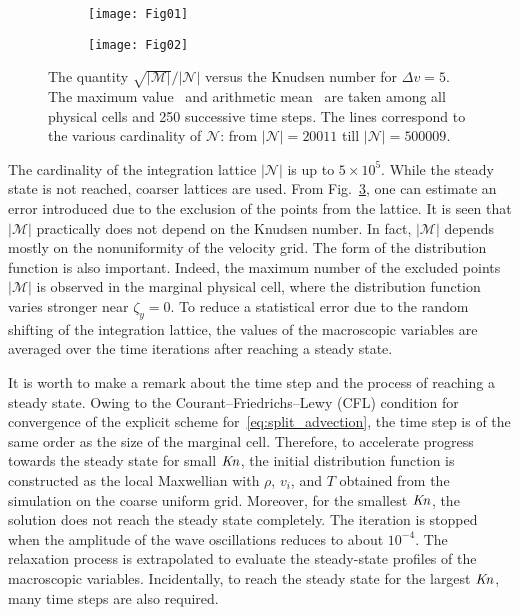 \documentclass[final]{jfm} %
\newcommand{\Kn}{\mbox{\textit{Kn}}}
\newcommand{\Nu}{\mathcal{N}}
\newcommand{\Mu}{\mathcal{M}}
\begin{document}
\begin{figure}
    \centering
    \begin{subfigure}[b]{.5\linewidth}
        \texttt{[image: Fig01]}
        \caption{}
        \label{fig:exclusions-max}
    \end{subfigure}%
    \begin{subfigure}[b]{.5\linewidth}
        \texttt{[image: Fig02]}
        \caption{}
        \label{fig:exclusions-mean}
    \end{subfigure}
    \caption{The quantity \(\sqrt{|\Mu|}/|\Nu|\) versus the Knudsen number for \(\Delta{v}=5\).
        The maximum value~ and arithmetic mean~
        are taken among all physical cells and 250 successive time steps.
        The lines correspond to the various cardinality of \(\Nu\):
        from \(|\Nu| = 20011\) till \(|\Nu| = 500009\).}
    \label{fig:exclusions}
\end{figure}

The cardinality of the integration lattice \(|\Nu|\) is up to \(5\times10^5\).
While the steady state is not reached, coarser lattices are used.
From Fig.~\ref{fig:exclusions}, one can estimate an error introduced
due to the exclusion of the points from the lattice.
It is seen that \(|\Mu|\) practically does not depend on the Knudsen number.
In fact, \(|\Mu|\) depends mostly on the nonuniformity of the velocity grid.
The form of the distribution function is also important.
Indeed, the maximum number of the excluded points \(|\Mu|\) is observed in the marginal physical cell,
where the distribution function varies stronger near \(\zeta_y=0\).
To reduce a statistical error due to the random shifting of the integration lattice,
the values of the macroscopic variables are averaged over the time iterations
after reaching a steady state.

It is worth to make a remark about the time step and the process of reaching a steady state.
Owing to the Courant--Friedrichs--Lewy (CFL) condition
for convergence of the explicit scheme for~\eqref{eq:split_advection},
the time step is of the same order as the size of the marginal cell.
Therefore, to accelerate progress towards the steady state for small \(\Kn\),
the initial distribution function is constructed as the local Maxwellian
with \(\rho\), \(v_i\), and \(T\) obtained from the simulation on the coarse uniform grid.
Moreover, for the smallest \(\Kn\), the solution does not reach the steady state completely.
The iteration is stopped when the amplitude of the wave oscillations reduces to about \(10^{-4}\).
The relaxation process is extrapolated to evaluate the steady-state profiles of the macroscopic variables.
Incidentally, to reach the steady state for the largest \(\Kn\), many time steps are also required.
\end{document}
